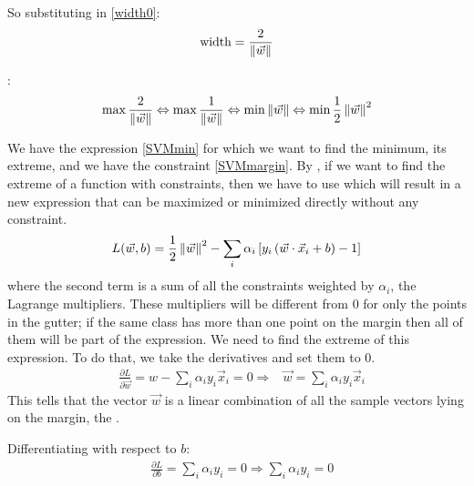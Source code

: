 So substituting in \autoref{width0}:
\begin{equation}
\begin{aligned}
\text{width} = \frac{2}{\left\lVert\vec{w}\right\rVert}
\end{aligned}
\label{width1}
\end{equation}

:
\begin{equation}
\max \frac{2}{\left\lVert\vec{w}\right\rVert} \Leftrightarrow \max \frac{1}{\left\lVert\vec{w}\right\rVert} \Leftrightarrow\min \left\lVert\vec{w}\right\rVert \Leftrightarrow \min \frac{1}{2} \left\lVert\vec{w}\right\rVert^2
\label{SVMmin}
\end{equation}

We have the expression \autoref{SVMmin} for which we want to find the minimum, its extreme, and we have the constraint \autoref{SVMmargin}. By , if we want to find the extreme of a function with constraints, then we have to use  which will result in a new expression that can be maximized or minimized directly without any constraint. 
\begin{equation}
L(\vec{w}, b) = \frac{1}{2}\left\lVert\vec{w}\right\rVert^2 - \sum_i \alpha_i\left[ y_i\left( \vec{w}\cdot \vec{x}_i+b\right)-1\right]
\label{SVMLagranceMult}
\end{equation}
where the second term is a sum of all the constraints weighted by $\alpha_i$, the Lagrange multipliers. These multipliers will be different from $0$ for only the points in the gutter; if the same class has more than one point on the margin then all of them will be part of the expression. We need to find the extreme of this expression. To do that, we take the derivatives and set them to $0$.
\begin{equation}
\begin{aligned}
&\frac{\partial L}{\partial \vec{w}} = w - \sum_i \alpha_i y_i \vec{x}_i = 0 \Rightarrow &\vec{w} = \sum_i \alpha_i y_i \vec{x}_i
\end{aligned}
\label{SVMLagrDevw}
\end{equation}
This tells that the vector $\vec{w}$ is a linear combination of all the sample vectors lying on the margin, the .

Differentiating with respect to $b$:
\begin{equation}
\begin{aligned}
&\frac{\partial L}{\partial b} = \sum_i \alpha_i y_i = 0 \Rightarrow \sum_i \alpha_i y_i = 0
\end{aligned}
\label{SVMLagrDevb}
\end{equation}

